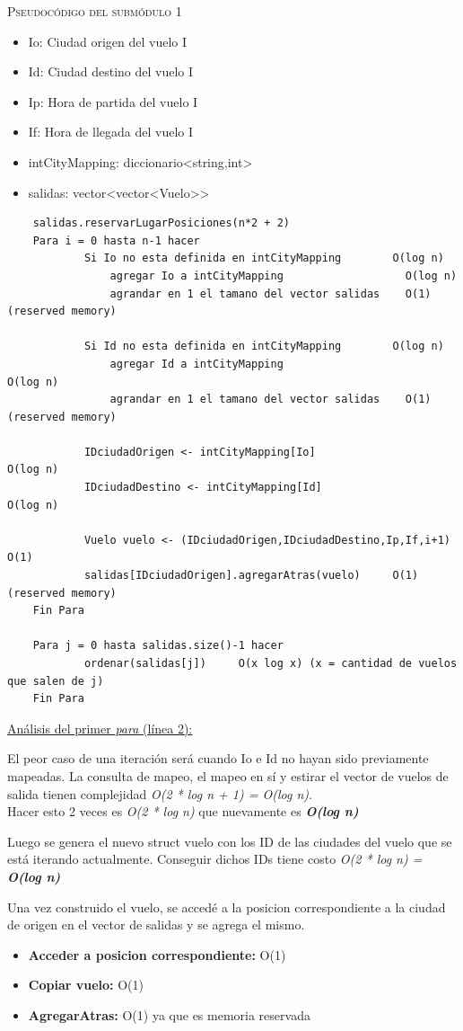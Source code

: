 \documentclass[10pt,a4paper]{article}
\begin{document}
\textsc{Pseudocódigo del submódulo 1}
\begin{itemize}
\item Io: Ciudad origen del vuelo I
\item Id: Ciudad destino del vuelo I
\item Ip: Hora de partida del vuelo I
\item If: Hora de llegada del vuelo I
\item intCityMapping: diccionario\textless string,int\textgreater
\item salidas: vector\textless vector\textless Vuelo\textgreater\textgreater
\end{itemize}
\begin{lstlisting}
	salidas.reservarLugarPosiciones(n*2 + 2)
	Para i = 0 hasta n-1 hacer
			Si Io no esta definida en intCityMapping        O(log n)
				agregar	Io a intCityMapping                   O(log n)	
				agrandar en 1 el tamano del vector salidas    O(1) (reserved memory)
				
			Si Id no esta definida en intCityMapping        O(log n)
				agregar	Id a intCityMapping				            O(log n)	
				agrandar en 1 el tamano del vector salidas    O(1) (reserved memory)	
		
			IDciudadOrigen <- intCityMapping[Io]				    O(log n)
			IDciudadDestino <- intCityMapping[Id]				    O(log n)			
			
			Vuelo vuelo <- (IDciudadOrigen,IDciudadDestino,Ip,If,i+1)	  O(1)		
			salidas[IDciudadOrigen].agregarAtras(vuelo)     O(1) (reserved memory)
	Fin Para	
			
	Para j = 0 hasta salidas.size()-1 hacer
			ordenar(salidas[j])		O(x log x) (x = cantidad de vuelos que salen de j)
	Fin Para
\end{lstlisting}

\underline{Análisis del primer \textit{para} (línea 2):}

\noindent El peor caso de una iteración será cuando Io e Id no hayan sido previamente mapeadas.
La consulta de mapeo, el mapeo en sí y estirar el vector de vuelos de salida tienen complejidad \textit{O(2 * log n + 1) = O(log n)}.\\ Hacer esto 2 veces es \textit{O(2 * log n)} que nuevamente es \textbf{\textit{O(log n)}}

\noindent Luego se genera el nuevo struct vuelo con los ID de las ciudades del vuelo que se está iterando actualmente. Conseguir dichos IDs tiene costo \textit{O(2 * log n) = \textbf{O(log n)}}

\noindent Una vez construido el vuelo, se accedé a la posicion correspondiente a la ciudad de origen en el vector de salidas y se agrega el mismo.
\begin{itemize}
\item \textbf{Acceder a posicion correspondiente:} O(1)
\item \textbf{Copiar vuelo:} O(1)
\item \textbf{AgregarAtras:} O(1) ya que es memoria reservada
\end{itemize}
\end{document}
